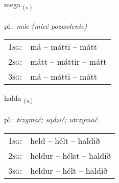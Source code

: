 \documentclass[frontgrid, backgrid]{flacards}\usepackage[]{graphicx}\usepackage[]{xcolor}
\begin{document}
\renewcommand{\blhead}{\vskip5pt {\small\bfseries\footnotesize Sagnorð | czasownik }}
\renewcommand{\bcfoot}{\vskip5pt \hspace{2pt}{\small\bfseries\footnotesize 1K}}


{mega \small{\textsubscript{(\textit{v.})}} \\[1ex] %
\textphonetic{[meiːɣa]} \\
pl.: \emph{móc (mieć pozwolenie)} \\  [2ex]
\renewcommand*{\arraystretch}{0.8}
\begin{tabular}{p{1cm}l}
\textsc{1sg}: & má -- mátti -- mátt \\ 
\textsc{2sg}: & mátt -- máttir -- mátt \\ 
\textsc{3sg}: & má -- mátti -- mátt \\ 
\end{tabular}
}

\renewcommand{\flhead}{\vskip5pt \fboxsep=0pt {\small\bfseries\footnotesize Sagnorð | czasownik}}
\renewcommand{\fcfoot}{\vskip5pt \fboxsep=0pt \hspace{2pt}{\small\bfseries\footnotesize 1K}}

\renewcommand{\blhead}{\vskip5pt {\small\bfseries\footnotesize Sagnorð | czasownik }}
\renewcommand{\bcfoot}{\vskip5pt \hspace{2pt}{\small\bfseries\footnotesize 1K}}


{halda \small{\textsubscript{(\textit{v.})}} \\[1ex] %
\textphonetic{[halta]} \\
pl.: \emph{trzymać; sądzić; utrzymać} \\  [2ex]
\renewcommand*{\arraystretch}{0.8}
\begin{tabular}{p{1cm}l}
\textsc{1sg}: & held -- hélt -- haldið \\ 
\textsc{2sg}: & heldur -- hélst -- haldið \\ 
\textsc{3sg}: & heldur -- hélt -- haldið \\ 
\end{tabular}
}
\end{document}
